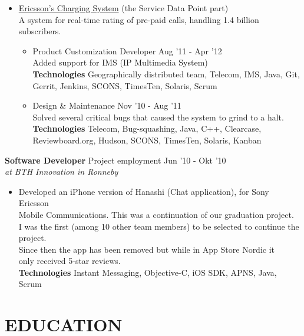 \documentclass[overlapped]{res}
\begin{document}
\begin{resume}
\begin{itemize}
\item \href{http://www.ericsson.com/ourportfolio/telecom-operators/ericsson-charging-system?nav=marketcategory007%7Csubarea014}{Ericsson's Charging System} (the Service Data Point part)
	\\A system for real-time rating of pre-paid calls, handling 1.4 billion subscribers.
	\begin{itemize}
	\itemsep -1pt
 	\item Product Customization Developer \hfill Aug '11 - Apr '12
     		\\Added support for IMS (IP Multimedia System)
		\\{\bf Technologies} Geographically distributed team, Telecom, IMS, Java, Git,
		\\Gerrit, Jenkins, SCONS, TimesTen, Solaris, Scrum
 	\item Design \& Maintenance \hfill Nov '10 - Aug '11
     		\\Solved several critical bugs that caused the system to grind to a halt.
		\\{\bf Technologies} Telecom, Bug-squashing, Java, C++, Clearcase, 
		\\Reviewboard.org, Hudson, SCONS, TimesTen, Solaris, Kanban
	\end{itemize}
\end{itemize}

{\bf Software Developer} Project employment \hfill Jun '10 - Okt '10 \\
{\sl at BTH Innovation in Ronneby}
\begin{itemize}
\itemsep -1pt
\item Developed an iPhone version of Hanashi (Chat application), for Sony Ericsson \\Mobile Communications. This was a continuation of our graduation project. 
\\I was the first (among 10 other team members) to be selected to continue the project.
\\Since then the app has been removed but while in App Store Nordic it 
\\only received 5-star reviews.
\\{\bf Technologies} Instant Messaging, Objective-C, iOS SDK, APNS, Java, Scrum
\end{itemize}

\section{{\sc EDUCATION}}


\end{resume}
\end{document}
